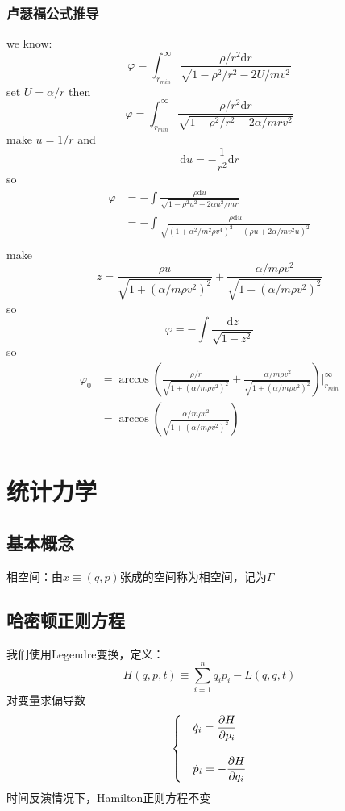 \documentclass[12pt]{report}
\begin{document}
\subsection{卢瑟福公式推导}
we know:
\begin{equation*}
    \varphi=\int^{\infty}_{r_{min}} \frac{\rho/r^2 \mathrm{d}r}{\sqrt{1-\rho^2/r^2-2U/mv^2}}
\end{equation*}
set $U=\alpha/r$ then
\begin{equation}
        \varphi=\int^{\infty}_{r_{min}} \frac{\rho/r^2 \mathrm{d}r}{\sqrt{1-\rho^2/r^2-2\alpha/mrv^2}}
\end{equation}
make $u=1/r$ and
$$\mathrm{d}u=-\frac{1}{r^2}\mathrm{d}r$$
so
\begin{equation}
    \begin{array}{ll}
    \varphi&=\displaystyle{-\int} \frac{\rho \mathrm{d}u}{\sqrt{1-\rho^2 u^2-2\alpha u^2/mr}}\\
    &=-\displaystyle{\int} \frac{\rho \mathrm{d}u}{\sqrt{\left(1+\alpha^2/m^2\rho v^4\right)^2-\left(\rho u+2\alpha/mv^2u\right)^2}}\\
    \end{array}
\end{equation}
make $$z =\frac{\rho u}{\sqrt{1+\left(\alpha/m\rho v^2\right)^2}}+\frac{\alpha/m\rho v^2}{\sqrt{1+\left(\alpha/m\rho v^2\right)^2}}$$
so
$$\varphi=-\displaystyle{\int} \frac{\mathrm{d}z}{\sqrt{1-z^2}}$$
so
\begin{equation}
    \begin{array}{ll}
        \varphi_0 &=\arccos \left(\frac{\rho/r}{\sqrt{1+\left(\alpha/m\rho v^2\right)^2}}+\frac{\alpha/m\rho v^2}{\sqrt{1+\left(\alpha/m\rho v^2\right)^2}}\right)\bigg|^{\infty}_{r_{min}}\\
                &=\arccos \left(\frac{\alpha/m\rho v^2}{\sqrt{1+\left(\alpha/m\rho v^2\right)^2}}\right)\\
    \end{array}
\end{equation}
\newpage

\chapter{统计力学}
\section{基本概念}
相空间：由$x\equiv (q,p)$张成的空间称为相空间，记为$\Gamma$
\section{哈密顿正则方程}
我们使用Legendre变换，定义：
$$ H(q,p,t) \equiv \sum_{i=1}^{n} \dot{q}_i p_i - L(q,\dot{q},t)$$
对变量求偏导数
$$\begin{cases}
    &\dot{q}_i =\displaystyle{\pdv{H}{p_i}}\\
    &\quad \\
    &\dot{p}_i =\displaystyle{-\pdv{H}{q_i}}
\end{cases}$$
时间反演情况下，Hamilton正则方程不变
\end{document}
